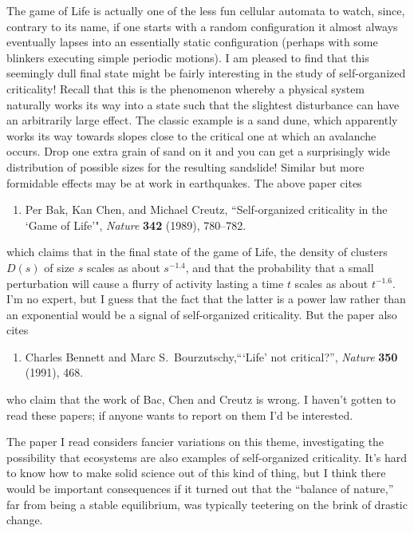 \documentclass[12pt]{article}
\def\tightlist{}
\begin{document}
The game of Life is actually one of the less fun cellular automata to
watch, since, contrary to its name, if one starts with a random
configuration it almost always eventually lapses into an essentially
static configuration (perhaps with some blinkers executing simple
periodic motions). I am pleased to find that this seemingly dull final
state might be fairly interesting in the study of self-organized
criticality! Recall that this is the phenomenon whereby a physical
system naturally works its way into a state such that the slightest
disturbance can have an arbitrarily large effect. The classic example is
a sand dune, which apparently works its way towards slopes close to the
critical one at which an avalanche occurs. Drop one extra grain of sand
on it and you can get a surprisingly wide distribution of possible sizes
for the resulting sandslide! Similar but more formidable effects may be
at work in earthquakes. The above paper cites

\begin{enumerate}
\def\labelenumi{\arabic{enumi})}
\setcounter{enumi}{1}
\tightlist
\item
Per Bak, Kan Chen, and Michael Creutz, ``Self-organized criticality in the `Game of Life'",
\emph{Nature} \textbf{342} (1989), 780--782.
\end{enumerate}
\noindent
which claims that in the final state of the game of Life, the density of
clusters \(D(s)\) of size \(s\) scales as about \(s^{-1.4}\), and that
the probability that a small perturbation will cause a flurry of
activity lasting a time \(t\) scales as about \(t^{-1.6}\). I'm no
expert, but I guess that the fact that the latter is a power law rather
than an exponential would be a signal of self-organized criticality. But
the paper also cites

\begin{enumerate}
\def\labelenumi{\arabic{enumi})}
\setcounter{enumi}{2}
\tightlist
\item
Charles Bennett and Marc S.\ Bourzutschy,```Life' not critical?'', 
\emph{Nature} \textbf{350} (1991), 468.
\end{enumerate}
\noindent
who claim that the work of Bac, Chen and Creutz is wrong. I haven't
gotten to read these papers; if anyone wants to report on them I'd be
interested.

The paper I read considers fancier variations on this theme,
investigating the possibility that ecosystems are also examples of
self-organized criticality. It's hard to know how to make solid science
out of this kind of thing, but I think there would be important
consequences if it turned out that the ``balance of nature,'' far from
being a stable equilibrium, was typically teetering on the brink of
drastic change.
\end{document}
